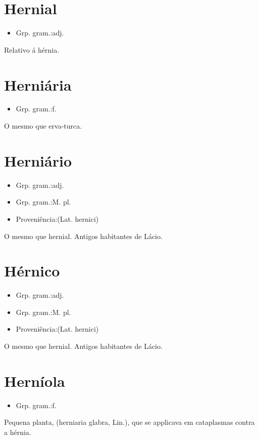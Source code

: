 \documentclass{article}
\begin{document}
\section{Hernial}
\begin{itemize}
\item {Grp. gram.:adj.}
\end{itemize}
Relativo á hérnia.
\section{Herniária}
\begin{itemize}
\item {Grp. gram.:f.}
\end{itemize}
O mesmo que \textunderscore erva-turca\textunderscore .
\section{Herniário}
\begin{itemize}
\item {Grp. gram.:adj.}
\end{itemize}
\begin{itemize}
\item {Grp. gram.:M. pl.}
\end{itemize}
\begin{itemize}
\item {Proveniência:(Lat. \textunderscore hernici\textunderscore )}
\end{itemize}
O mesmo que \textunderscore hernial\textunderscore .
Antigos habitantes de Lácio.
\section{Hérnico}
\begin{itemize}
\item {Grp. gram.:adj.}
\end{itemize}
\begin{itemize}
\item {Grp. gram.:M. pl.}
\end{itemize}
\begin{itemize}
\item {Proveniência:(Lat. \textunderscore hernici\textunderscore )}
\end{itemize}
O mesmo que \textunderscore hernial\textunderscore .
Antigos habitantes de Lácio.
\section{Herníola}
\begin{itemize}
\item {Grp. gram.:f.}
\end{itemize}
Pequena planta, (\textunderscore herniaria glabra\textunderscore , Lin.), que se applicava em cataplasmas contra a hérnia.
\end{document}
